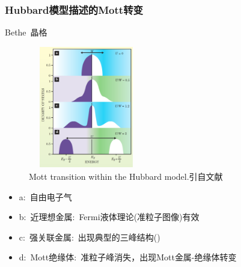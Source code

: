 {\frame
{
	\frametitle{\textrm{Hubbard}模型描述的\textrm{Mott}转变}
\begin{minipage}[b]{0.42\linewidth}
	\hspace{45pt} \textrm{Bethe}~晶格
\begin{figure}[h!]
\centering
\vspace{-5pt}
\includegraphics[height=2.1in,width=2.00in,viewport=0 0 800 950,clip]{Figures/Hubbard_U-W.png}
\caption{\textrm{\tiny Mott transition within the Hubbard model.引自文献\cite{PT57-53_2004}}}%
\label{Mott_Hubbard}
\end{figure}
\end{minipage}
\hfill
\begin{minipage}[t]{0.56\linewidth}
	\vspace*{-2.58in}
	\begin{itemize}
		\setlength{\itemsep}{14pt}
		\item \textrm{a}:~自由电子气
		\item \textrm{b}:~近理想金属:~\textrm{Fermi}液体理论(准粒子图像)有效
		\item \textrm{c}:~强关联金属:~出现典型的三峰结构({\fontsize{7.2pt}{5.2pt}})
		\item \textrm{d}:~\textrm{Mott}绝缘体:~准粒子峰消失，出现\textrm{Mott}金属-绝缘体转变
	\end{itemize}
\end{minipage}
}

}

